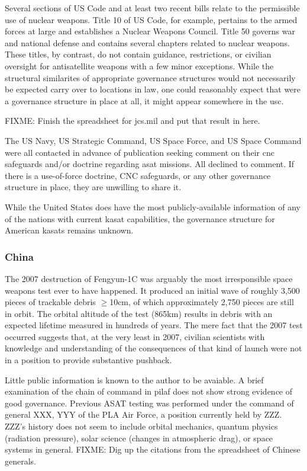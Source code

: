 Several sections of US Code and at least two recent bills relate to
the permissible use of nuclear weapons.  Title 10 of US Code, for
example, pertains to the armed forces at large and establishes a
Nuclear Weapons Council.  Title 50 governs war and national defense
and contains several chapters related to nuclear weapons.  These
titles, by contrast, do not contain guidance, restrictions, or
civilian oversight for antisatellite weapons with a few minor
exceptions.  While the structural similarites of appropriate
governance structures would not necessarily be expected carry over to
locations in law, one could reasonably expect that were a governance
structure in place at all, it might appear somewhere in the \acf{usc}.

FIXME: Finish the spreadsheet for jcs.mil and put that result in here.

The US Navy, US Strategic Command, US Space Force, and US Space
Command were all contacted in advance of publication seeking comment
on their \ac{cnc} safeguards and/or doctrine regarding \ac{asat}
missions.  All declined to comment.  If there is a use-of-force
doctrine, CNC safeguards, or any other governance structure in place,
they are unwilling to share it.

While the United States does have the most publicly-available
information of any of the nations with current \ac{kasat}
capabilities, the governance structure for American \acp{kasat}
remains unknown.


\subsubsection{China}

The 2007 destruction of Fengyun-1C was arguably the most irresponsible
space weapons test ever to have happened.  It produced an initial wave
of roughly 3,500 pieces of trackable debris $\ge$10cm, of which
approximately 2,750 pieces are still in orbit.\cite[p05-01]{brian} The
orbital altitude of the test (865km) results in debris with an
expected lifetime measured in hundreds of years.\cite[fig from
  SpaceX]{rando-orbit} The mere fact that the 2007 test occurred
suggests that, at the very least in 2007, civilian scientists with
knowledge and understanding of the consequences of that kind of launch
were not in a position to provide substantive pushback.

Little public information is known to the author to be avaiable.  A
brief examination of the chain of command in \ac{pilaf} does not show
strong evidence of good governance.  Previous ASAT testing was
performed under the command of general XXX, YYY of the PLA Air Force,
a position currently held by ZZZ.  ZZZ's history does not seem to
include orbital mechanics, quantum physics (radiation pressure), solar
science (changes in atmospheric drag), or space systems in general.
FIXME: Dig up the citations from the spreadsheet of Chinese generals.

